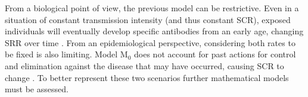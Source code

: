 From a biological point of view, the previous model can be restrictive.
Even in a situation of constant transmission intensity (and thus constant SCR), exposed individuals will eventually develop specific antibodies from an early age, changing SRR over time \cite{cook2011serological}.
From an epidemiological perspective, considering both rates to be fixed is also limiting.
Model M$_0$ does not account for past actions for control and elimination against the disease that may have occurred, causing SCR to change \cite{cook2010using, sepulveda2015current}.
To better represent these two scenarios further mathematical models must be assessed.

